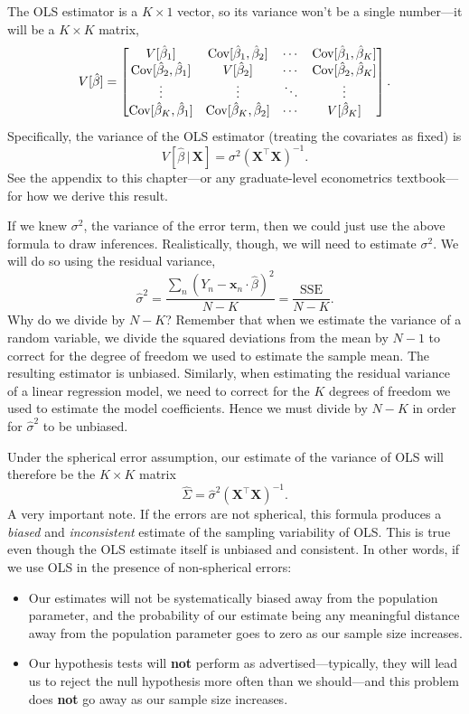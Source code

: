 \documentclass[12pt,oneside,openany]{book}
\begin{document}
The OLS estimator is a \(K \times 1\) vector, so its variance won't be a
single number---it will be a \(K \times K\) matrix, \[
V[\hat{\beta}] = \begin{bmatrix}
  V[\hat{\beta}_1] & \mathop{\rm Cov}\nolimits[\hat{\beta}_1, \hat{\beta}_2] & \cdots & \mathop{\rm Cov}\nolimits[\hat{\beta}_1, \hat{\beta}_K] \\
  \mathop{\rm Cov}\nolimits[\hat{\beta}_2, \hat{\beta}_1] & V[\hat{\beta}_2] & \cdots & \mathop{\rm Cov}\nolimits[\hat{\beta}_2, \hat{\beta}_K] \\
  \vdots & \vdots & \ddots & \vdots \\
  \mathop{\rm Cov}\nolimits[\hat{\beta}_K, \hat{\beta}_1] & \mathop{\rm Cov}\nolimits[\hat{\beta}_K, \hat{\beta}_2] & \cdots & V[\hat{\beta}_K] \\
\end{bmatrix}.
\] Specifically, the variance of the OLS estimator (treating the
covariates as fixed) is \[
V[\hat{\beta} \,|\, \mathbf{X}] = \sigma^2 (\mathbf{X}^\top \mathbf{X})^{-1}.
\] See the appendix to this chapter---or any graduate-level econometrics
textbook---for how we derive this result.

If we knew \(\sigma^2\), the variance of the error term, then we could
just use the above formula to draw inferences. Realistically, though, we
will need to estimate \(\sigma^2\). We will do so using the residual
variance, \[
\hat{\sigma}^2
= \frac{\sum_n (Y_n - \mathbf{x}_n \cdot \hat{\beta})^2}{N - K}
= \frac{\text{SSE}}{N - K}.
\] Why do we divide by \(N - K\)? Remember that when we estimate the
variance of a random variable, we divide the squared deviations from the
mean by \(N - 1\) to correct for the degree of freedom we used to
estimate the sample mean. The resulting estimator is unbiased.
Similarly, when estimating the residual variance of a linear regression
model, we need to correct for the \(K\) degrees of freedom we used to
estimate the model coefficients. Hence we must divide by \(N - K\) in
order for \(\hat{\sigma}^2\) to be unbiased.

Under the spherical error assumption, our estimate of the variance of
OLS will therefore be the \(K \times K\) matrix \[
\hat{\Sigma} = \hat{\sigma}^2 (\mathbf{X}^\top \mathbf{X})^{-1}.
\] A very important note. If the errors are not spherical, this formula
produces a \emph{biased} and \emph{inconsistent} estimate of the
sampling variability of OLS. This is true even though the OLS estimate
itself is unbiased and consistent. In other words, if we use OLS in the
presence of non-spherical errors:

\begin{itemize}
\item
  Our estimates will not be systematically biased away from the
  population parameter, and the probability of our estimate being any
  meaningful distance away from the population parameter goes to zero as
  our sample size increases.
\item
  Our hypothesis tests will \textbf{not} perform as
  advertised---typically, they will lead us to reject the null
  hypothesis more often than we should---and this problem does
  \textbf{not} go away as our sample size increases.
\end{itemize}
\end{document}
